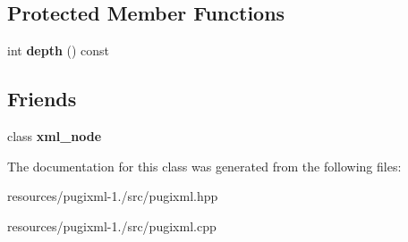 \subsection*{Protected Member Functions}
\begin{DoxyCompactItemize}
\item 
\hypertarget{classpugi_1_1xml__tree__walker_acb27ca9fea177b0741f29274cb0c805a}{int {\bfseries depth} () const }\label{classpugi_1_1xml__tree__walker_acb27ca9fea177b0741f29274cb0c805a}

\end{DoxyCompactItemize}
\subsection*{Friends}
\begin{DoxyCompactItemize}
\item 
\hypertarget{classpugi_1_1xml__tree__walker_a156d917a92815c7b593bd5ef19f6d5fb}{class {\bfseries xml\+\_\+node}}\label{classpugi_1_1xml__tree__walker_a156d917a92815c7b593bd5ef19f6d5fb}

\end{DoxyCompactItemize}


The documentation for this class was generated from the following files\+:\begin{DoxyCompactItemize}
\item 
resources/pugixml-\/1./src/pugixml.\+hpp\item 
resources/pugixml-\/1./src/pugixml.\+cpp\end{DoxyCompactItemize}
